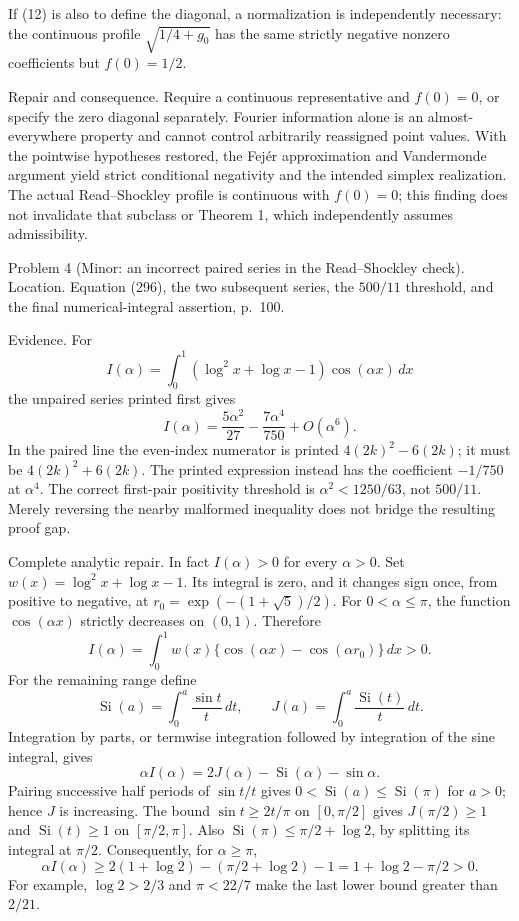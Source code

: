 \documentclass[10pt]{article}
\begin{document}
If (12) is also to define the diagonal, a normalization is independently necessary: the continuous profile \(\sqrt{1/4+g_0}\) has the same strictly negative nonzero coefficients but \(f(0)=1/2\).\par
Repair and consequence. Require a continuous representative and \(f(0)=0\), or specify the zero diagonal separately. Fourier information alone is an almost-everywhere property and cannot control arbitrarily reassigned point values. With the pointwise hypotheses restored, the Fejér approximation and Vandermonde argument yield strict conditional negativity and the intended simplex realization. The actual Read–Shockley profile is continuous with \(f(0)=0\); this finding does not invalidate that subclass or Theorem 1, which independently assumes admissibility.\par
Problem 4 (Minor: an incorrect paired series in the Read–Shockley check).  Location. Equation (296), the two subsequent series, the \(500/11\) threshold, and the final numerical-integral assertion, p. 100.\par
Evidence. For \[I(\alpha)=\int_0^1(\log^2x+\log x-1)\cos(\alpha x)\,dx\] the unpaired series printed first gives \[I(\alpha)=\frac{5\alpha^2}{27}-\frac{7\alpha^4}{750}+O(\alpha^6).\] In the paired line the even-index numerator is printed \(4(2k)^2-6(2k)\); it must be \(4(2k)^2+6(2k)\). The printed expression instead has the coefficient \(-1/750\) at \(\alpha^4\). The correct first-pair positivity threshold is \(\alpha^2<1250/63\), not \(500/11\). Merely reversing the nearby malformed inequality does not bridge the resulting proof gap.\par
Complete analytic repair. In fact \(I(\alpha)>0\) for every \(\alpha>0\). Set \(w(x)=\log^2x+\log x-1\). Its integral is zero, and it changes sign once, from positive to negative, at \(r_0=\exp(-(1+\sqrt5)/2)\). For \(0<\alpha\le\pi\), the function \(\cos(\alpha x)\) strictly decreases on \((0,1)\). Therefore \[I(\alpha)=\int_0^1w(x)\{\cos(\alpha x)-\cos(\alpha r_0)\}\,dx>0.\] For the remaining range define \[\operatorname{Si}(a)=\int_0^a\frac{\sin t}{t}\,dt,\qquad
 J(a)=\int_0^a\frac{\operatorname{Si}(t)}t\,dt.\] Integration by parts, or termwise integration followed by integration of the sine integral, gives \[\alpha I(\alpha)=2J(\alpha)-\operatorname{Si}(\alpha)-\sin\alpha.              \tag{2.3}\] Pairing successive half periods of \(\sin t/t\) gives \(0<\operatorname{Si}(a)\le\operatorname{Si}(\pi)\) for \(a>0\); hence \(J\) is increasing. The bound \(\sin t\ge2t/\pi\) on \([0,\pi/2]\) gives \(J(\pi/2)\ge1\) and \(\operatorname{Si}(t)\ge1\) on \([\pi/2,\pi]\). Also \(\operatorname{Si}(\pi)\le\pi/2+\log2\), by splitting its integral at \(\pi/2\). Consequently, for \(\alpha\ge\pi\), \[\alpha I(\alpha)\ge2(1+\log2)-(\pi/2+\log2)-1
 =1+\log2-\pi/2>0.                                             \tag{2.4}\] For example, \(\log2>2/3\) and \(\pi<22/7\) make the last lower bound greater than \(2/21\).\par
\end{document}
